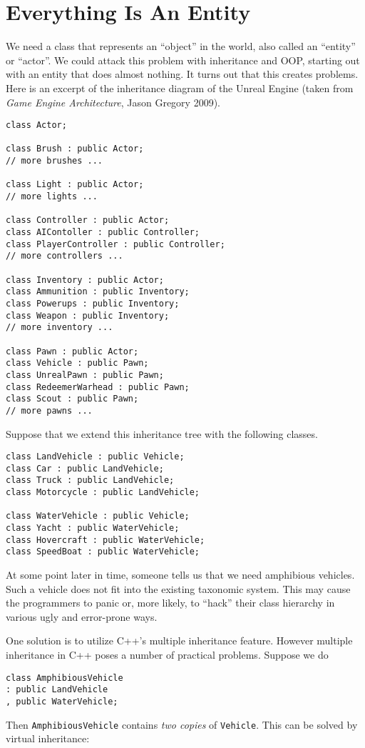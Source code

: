 \documentclass{article}
\begin{document}
\section{Everything Is An Entity}
We need a class that represents an ``object'' in the world, also called an ``entity'' or ``actor''. We could attack this problem with inheritance and OOP, starting out with an entity that does almost nothing. It turns out that this creates problems. Here is an excerpt of the inheritance diagram of the Unreal Engine (taken from \textit{Game Engine Architecture}, Jason Gregory 2009).
\begin{lstlisting}
class Actor;

class Brush : public Actor;
// more brushes ...

class Light : public Actor;
// more lights ...

class Controller : public Actor;
class AIContoller : public Controller;
class PlayerController : public Controller;
// more controllers ...

class Inventory : public Actor;
class Ammunition : public Inventory;
class Powerups : public Inventory;
class Weapon : public Inventory;
// more inventory ...

class Pawn : public Actor;
class Vehicle : public Pawn;
class UnrealPawn : public Pawn;
class RedeemerWarhead : public Pawn;
class Scout : public Pawn;
// more pawns ...
\end{lstlisting}
Suppose that we extend this inheritance tree with the following classes.
\begin{lstlisting}
class LandVehicle : public Vehicle;
class Car : public LandVehicle;
class Truck : public LandVehicle;
class Motorcycle : public LandVehicle;

class WaterVehicle : public Vehicle;
class Yacht : public WaterVehicle;
class Hovercraft : public WaterVehicle;
class SpeedBoat : public WaterVehicle;
\end{lstlisting}
At some point later in time, someone tells us that we need amphibious vehicles. Such a vehicle does not fit into the existing taxonomic system. This may cause the programmers to panic or, more likely, to ``hack'' their class hierarchy in various ugly and error-prone ways.

One solution is to utilize C++'s multiple inheritance feature. However multiple inheritance in C++ poses a number of practical problems.
Suppose we do
\begin{lstlisting}
class AmphibiousVehicle 
: public LandVehicle
, public WaterVehicle;
\end{lstlisting}
Then \texttt{AmphibiousVehicle} contains \emph{two copies} of \texttt{Vehicle}. This can be solved by virtual inheritance:
\end{document}
